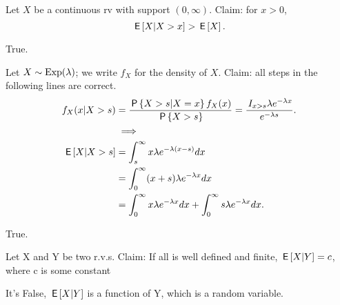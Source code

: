 \documentclass[tf-tutorial-all.tex]{subfiles}
\begin{document}
\begin{truefalse}
Let $X$ be a continuous rv with support $(0, \infty)$. Claim: for $x>0$,
\begin{equation}
\label{eq:6}
\,\mathsf{E}\left[X|X>x\right]>\,\mathsf{E}\left[X\right].
\end{equation}
\begin{solution}
True.
\end{solution}
\end{truefalse}

\begin{truefalse}
Let $X \sim \mathrm{Exp}(\lambda)$; we write $f_{X}$ for the density of $X$.
Claim:  all steps in the following lines are correct.
\begin{align*}
 f_{X}(x|X>s) &= \frac{\,\mathsf{P}\left\{X>s|X=x\right\}f_{X}(x)}{\,\mathsf{P}\left\{X>s\right\}} = \frac{ \,I_{x > s} \lambda e^{-\lambda x}}{e^{-\lambda s}}. \\
&  \implies \\
    \,\mathsf{E}\left[X|X>s\right] &= \int^{\infty}_{s} x \lambda e^{-\lambda(x-s)} dx\\
    &= \int^{\infty}_{0}(x + s) \lambda e^{-\lambda x} dx \\
    &= \int^{\infty}_{0}x  \lambda e^{-\lambda x} dx + \int^{\infty}_{0} s \lambda e^{-\lambda x} dx.
\end{align*}
\begin{solution}
True.
\end{solution}
\end{truefalse}

\begin{truefalse}
Let X and Y be two r.v.s. Claim:
If all is well defined and finite, $\,\mathsf{E}\left[X|Y\right] = c$, where c is some constant
\begin{solution}
It's False, $\,\mathsf{E}\left[X|Y\right]$ is a function of Y, which is a random variable.
\end{solution}
\end{truefalse}
\end{document}
